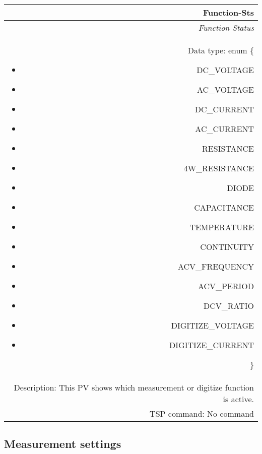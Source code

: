 \documentclass[openany]{article}
\begin{document}
		\begin{tabular}{N}
			\hline
			\bfseries Function-Sts\label{pv:function-sts} \\ \hline
			\emph{Function Status} \\
			Data type: enum \{\begin{itemize}[noitemsep]
				\item[] DC\_VOLTAGE
				\item[] AC\_VOLTAGE
				\item[] DC\_CURRENT
				\item[] AC\_CURRENT
				\item[] RESISTANCE
				\item[] 4W\_RESISTANCE
				\item[] DIODE
				\item[] CAPACITANCE
				\item[] TEMPERATURE
				\item[] CONTINUITY
				\item[] ACV\_FREQUENCY
				\item[] ACV\_PERIOD
				\item[] DCV\_RATIO
				\item[] DIGITIZE\_VOLTAGE
				\item[] DIGITIZE\_CURRENT
			\end{itemize}\} \\
			Description: This PV shows which measurement or digitize function is active. \\
			TSP command: No command
		\end{tabular}

	\subsection{Measurement settings}\label{pvgroup:meas-settings}

		\paragraph{} %
\end{document}
